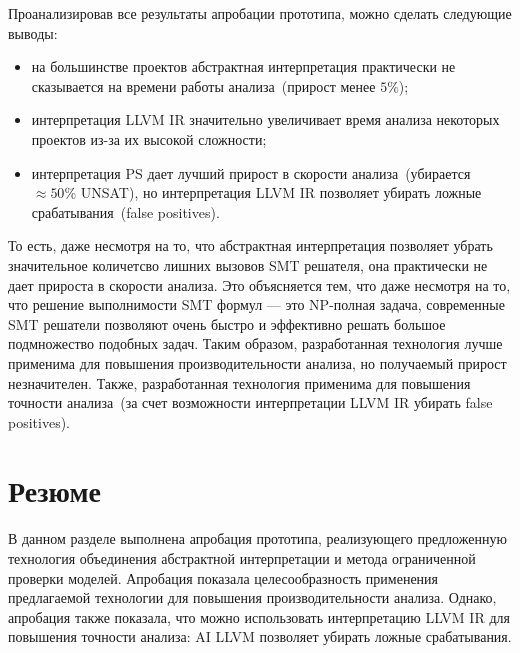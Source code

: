 Проанализировав все результаты апробации прототипа, можно сделать следующие 
выводы:
\begin{itemize}
\item на большинстве проектов абстрактная интерпретация практически не 
сказывается на времени работы анализа~(прирост менее $5\%$);
\item интерпретация LLVM IR значительно увеличивает время анализа некоторых
проектов из-за их высокой сложности;
\item интерпретация PS дает лучший прирост в скорости анализа~(убирается 
$\approx 50\%$ UNSAT), но интерпретация LLVM IR позволяет убирать ложные 
срабатывания~(false positives).
\end{itemize}

То есть, даже несмотря на то, что абстрактная интерпретация позволяет убрать
значительное количетсво лишних вызовов SMT решателя, она практически не
дает прироста в скорости анализа. Это объясняется тем, что даже несмотря на то, 
что решение выполнимости SMT формул --- это NP-полная задача, современные 
SMT решатели позволяют очень быстро и эффективно решать большое подмножество
подобных задач. Таким образом, разработанная технология лучше применима для
повышения производительности анализа, но получаемый прирост незначителен.
Также, разработанная технология применима для повышения точности анализа~(за 
счет возможности интерпретации LLVM IR убирать false positives).

\section{Резюме}
В данном разделе выполнена апробация прототипа, реализующего предложенную
технология объединения абстрактной интерпретации и метода ограниченной проверки
моделей. Апробация показала целесообразность применения предлагаемой 
технологии для повышения производительности анализа. Однако, апробация
также показала, что можно использовать интерпретацию LLVM IR для повышения
точности анализа: AI LLVM позволяет убирать ложные срабатывания.